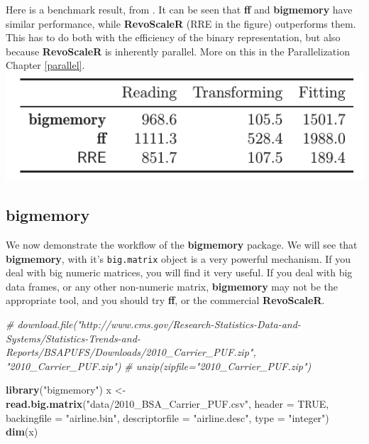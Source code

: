 \documentclass[]{book}
\newenvironment{Shaded}{\begin{snugshade}}{\end{snugshade}}
\newcommand{\KeywordTok}[1]{\textcolor[rgb]{0.13,0.29,0.53}{\textbf{#1}}}
\newcommand{\DataTypeTok}[1]{\textcolor[rgb]{0.13,0.29,0.53}{#1}}
\newcommand{\StringTok}[1]{\textcolor[rgb]{0.31,0.60,0.02}{#1}}
\newcommand{\CommentTok}[1]{\textcolor[rgb]{0.56,0.35,0.01}{\textit{#1}}}
\newcommand{\OtherTok}[1]{\textcolor[rgb]{0.56,0.35,0.01}{#1}}
\newcommand{\NormalTok}[1]{#1}
\theoremstyle{definition}
\theoremstyle{definition}
\theoremstyle{definition}
\theoremstyle{remark}
\begin{document}
Here is a benchmark result, from \citet{wang2015statistical}. It can be
seen that \textbf{ff} and \textbf{bigmemory} have similar performance,
while \textbf{RevoScaleR} (RRE in the figure) outperforms them. This has
to do both with the efficiency of the binary representation, but also
because \textbf{RevoScaleR} is inherently parallel. More on this in the
Parallelization Chapter \ref{parallel}.
\includegraphics{art/benchmark.png}

\subsection{bigmemory}\label{bigmemory}

We now demonstrate the workflow of the \textbf{bigmemory} package. We
will see that \textbf{bigmemory}, with it's \texttt{big.matrix} object
is a very powerful mechanism. If you deal with big numeric matrices, you
will find it very useful. If you deal with big data frames, or any other
non-numeric matrix, \textbf{bigmemory} may not be the appropriate tool,
and you should try \textbf{ff}, or the commercial \textbf{RevoScaleR}.

\begin{Shaded}
\begin{Highlighting}[]
\CommentTok{# download.file("http://www.cms.gov/Research-Statistics-Data-and-Systems/Statistics-Trends-and-Reports/BSAPUFS/Downloads/2010_Carrier_PUF.zip", "2010_Carrier_PUF.zip")}
\CommentTok{# unzip(zipfile="2010_Carrier_PUF.zip")}

\KeywordTok{library}\NormalTok{(}\StringTok{"bigmemory"}\NormalTok{)}
\NormalTok{x <-}\StringTok{ }\KeywordTok{read.big.matrix}\NormalTok{(}\StringTok{"data/2010_BSA_Carrier_PUF.csv"}\NormalTok{, }\DataTypeTok{header =} \OtherTok{TRUE}\NormalTok{, }
                     \DataTypeTok{backingfile =} \StringTok{"airline.bin"}\NormalTok{, }
                     \DataTypeTok{descriptorfile =} \StringTok{"airline.desc"}\NormalTok{, }
                     \DataTypeTok{type =} \StringTok{"integer"}\NormalTok{)}
\KeywordTok{dim}\NormalTok{(x)}
\end{Highlighting}
\end{Shaded}
\end{document}
